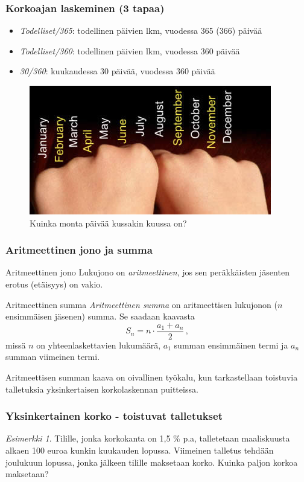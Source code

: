 \documentclass{article}\usepackage[]{graphicx}\usepackage[]{color}
\theoremstyle{remark}
\newtheorem{esim}{Esimerkki}
\begin{document}
\begin{frame}
    \frametitle{Korkoajan laskeminen (3 tapaa)}
    \pause
    \begin{itemize}[<+->]
        \item \emph{Todelliset/365}: todellinen päivien lkm, vuodessa 365 (366) päivää
        \item \emph{Todelliset/360}: todellinen päivien lkm, vuodessa 360 päivää
        \item \emph{30/360}: kuukaudessa 30 päivää, vuodessa 360 päivää
    \end{itemize}
    \pause
    \begin{figure}
        \centering
        \includegraphics[scale=0.7]{months}
        \caption{Kuinka monta päivää kussakin kuussa on?}
    \end{figure}
\end{frame}
\begin{frame}
    \frametitle{Aritmeettinen jono ja summa}
    \begin{block}{Aritmeettinen jono}
        Lukujono \pause on \emph{aritmeettinen}, jos sen peräkkäisten jäsenten erotus (etäisyys) on vakio.
    \end{block}
    \pause
    \begin{block}{Aritmeettinen summa}
        \emph{Aritmeettinen summa} \pause on aritmeettisen lukujonon ($n$ ensimmäisen jäsenen) summa. \pause Se saadaan kaavasta
        \[
            S_n = n \cdot \frac{a_1 + a_n}{2}\,,
        \]
        \pause missä $n$ on yhteenlaskettavien lukumäärä, \pause $a_1$ summan ensimmäinen termi ja \pause $a_n$ summan viimeinen termi.
    \end{block}
    \pause
    Aritmeettisen summan kaava on oivallinen työkalu, kun tarkastellaan toistuvia talletuksia yksinkertaisen korkolaskennan puitteissa.
\end{frame}

\begin{frame}
    \frametitle{Yksinkertainen korko - toistuvat talletukset}
    \begin{esim}
        Tilille, jonka korkokanta on 1,5 \% p.a, talletetaan maaliskuusta alkaen 100 euroa kunkin kuukauden lopussa.
        Viimeinen talletus tehdään joulukuun lopussa, jonka jälkeen tilille maksetaan korko. Kuinka paljon korkoa maksetaan?
    \end{esim}
\end{frame}
\end{document}

